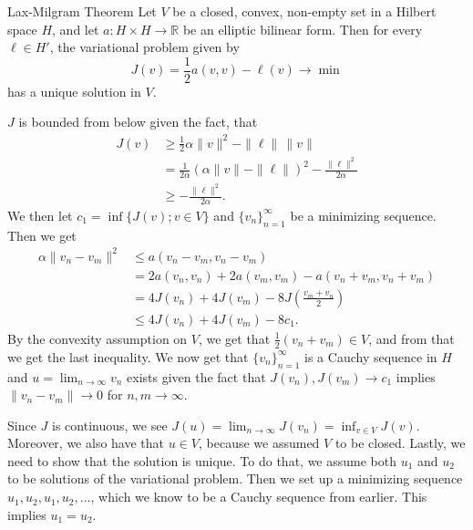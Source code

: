 \begin{thmx}{Lax-Milgram Theorem}
Let $V$ be a closed, convex, non-empty set in a Hilbert space $H$, and let $a:H \times H \rightarrow \mathbb{R}$ be an elliptic bilinear form. Then for every $\ell\in H'$, the variational problem given by
\[
    J(v)=\frac{1}{2} a(v,v) - \ell(v) \longrightarrow \min    
\]
has a unique solution in $V$.\label{thm:lax_milgram}
\end{thmx}

\begin{bev}
    $J$ is bounded from below given the fact, that
    \begin{align*}
        J(v) &\geq \frac{1}{2} \alpha \|v\|^2 - \|\ell\| \, \|v\|\\
        &= \frac{1}{2\alpha} {(\alpha \|v\|-\|\ell\|)}^2 - \frac{\|\ell\|^2}{2\alpha} \\
        &\geq - \frac{\|\ell\|^2}{2\alpha}.
    \end{align*}
    We then let $c_1 = \inf\{J(v); v \in V\}$ and ${\{v_n \}}_{n=1}^\infty$ be a minimizing sequence. Then we get 
    \begin{align*}
        \alpha \|v_n-v_m\|^2 &\leq a(v_n-v_m,v_n-v_m) \\
        &= 2a(v_n,v_n) + 2a(v_m,v_m) - a (v_n+v_m,v_n+v_m) \\
        &= 4J(v_n) + 4J(v_m) - 8J(\frac{v_m+v_n}{2}) \\
        &\leq 4J(v_n) + 4J(v_m) - 8c_1. 
    \end{align*}
    By the convexity assumption on $V$, we get that $\frac{1}{2}(v_n + v_m) \in V$, and from that we get the last 
    inequality.
    We now get that ${\{v_n \}}_{n=1}^\infty$ is a Cauchy sequence in $H$ and $u = \lim_{n\rightarrow \infty}v_n$ exists given the fact that $J(v_n),J(v_m)\rightarrow c_1$ implies $\|v_n - v_m\| \rightarrow 0$ for $n,m\rightarrow \infty$.  

    Since $J$ is continuous,
    we see $J(u) = \lim_{n\rightarrow \infty} J(v_n) = \inf_{v\in V} J(v)$.
     Moreover, we also have that $u\in V$, because we assumed $V$ to be closed. 
    Lastly, we need to show that the solution is unique.
     To do that, we assume both $u_1$ and $u_2$ to be solutions of the variational problem. 
    Then we set up a minimizing sequence $u_1,u_2,u_1,u_2,\ldots$, which we know to be a Cauchy sequence from earlier.
     This implies $u_1 = u_2$.
\end{bev}